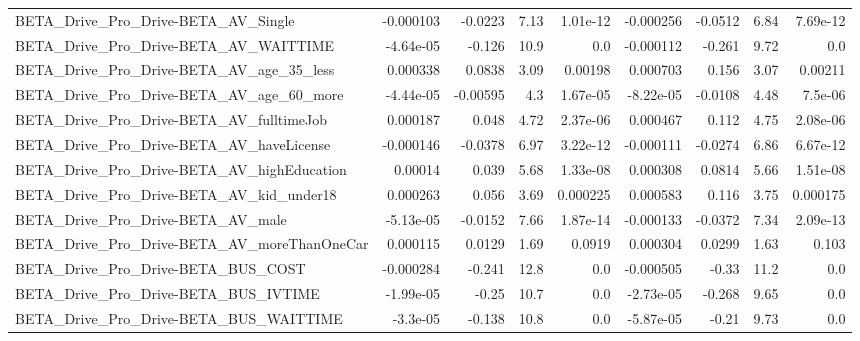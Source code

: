 \begin{tabular}{lrrrrrrrr}
BETA\_Drive\_Pro\_Drive-BETA\_AV\_Single                &   -0.000103 &      -0.0223 &      7.13 & 1.01e-12 &  -0.000256 &     -0.0512 &         6.84 &      7.69e-12 \\
BETA\_Drive\_Pro\_Drive-BETA\_AV\_WAITTIME              &   -4.64e-05 &       -0.126 &      10.9 &      0.0 &  -0.000112 &      -0.261 &         9.72 &           0.0 \\
BETA\_Drive\_Pro\_Drive-BETA\_AV\_age\_35\_less           &    0.000338 &       0.0838 &      3.09 &  0.00198 &   0.000703 &       0.156 &         3.07 &       0.00211 \\
BETA\_Drive\_Pro\_Drive-BETA\_AV\_age\_60\_more           &   -4.44e-05 &     -0.00595 &       4.3 & 1.67e-05 &  -8.22e-05 &     -0.0108 &         4.48 &       7.5e-06 \\
BETA\_Drive\_Pro\_Drive-BETA\_AV\_fulltimeJob           &    0.000187 &        0.048 &      4.72 & 2.37e-06 &   0.000467 &       0.112 &         4.75 &      2.08e-06 \\
BETA\_Drive\_Pro\_Drive-BETA\_AV\_haveLicense           &   -0.000146 &      -0.0378 &      6.97 & 3.22e-12 &  -0.000111 &     -0.0274 &         6.86 &      6.67e-12 \\
BETA\_Drive\_Pro\_Drive-BETA\_AV\_highEducation         &     0.00014 &        0.039 &      5.68 & 1.33e-08 &   0.000308 &      0.0814 &         5.66 &      1.51e-08 \\
BETA\_Drive\_Pro\_Drive-BETA\_AV\_kid\_under18           &    0.000263 &        0.056 &      3.69 & 0.000225 &   0.000583 &       0.116 &         3.75 &      0.000175 \\
BETA\_Drive\_Pro\_Drive-BETA\_AV\_male                  &   -5.13e-05 &      -0.0152 &      7.66 & 1.87e-14 &  -0.000133 &     -0.0372 &         7.34 &      2.09e-13 \\
BETA\_Drive\_Pro\_Drive-BETA\_AV\_moreThanOneCar        &    0.000115 &       0.0129 &      1.69 &   0.0919 &   0.000304 &      0.0299 &         1.63 &         0.103 \\
BETA\_Drive\_Pro\_Drive-BETA\_BUS\_COST                 &   -0.000284 &       -0.241 &      12.8 &      0.0 &  -0.000505 &       -0.33 &         11.2 &           0.0 \\
BETA\_Drive\_Pro\_Drive-BETA\_BUS\_IVTIME               &   -1.99e-05 &        -0.25 &      10.7 &      0.0 &  -2.73e-05 &      -0.268 &         9.65 &           0.0 \\
BETA\_Drive\_Pro\_Drive-BETA\_BUS\_WAITTIME             &    -3.3e-05 &       -0.138 &      10.8 &      0.0 &  -5.87e-05 &       -0.21 &         9.73 &           0.0 \\

\end{tabular}
